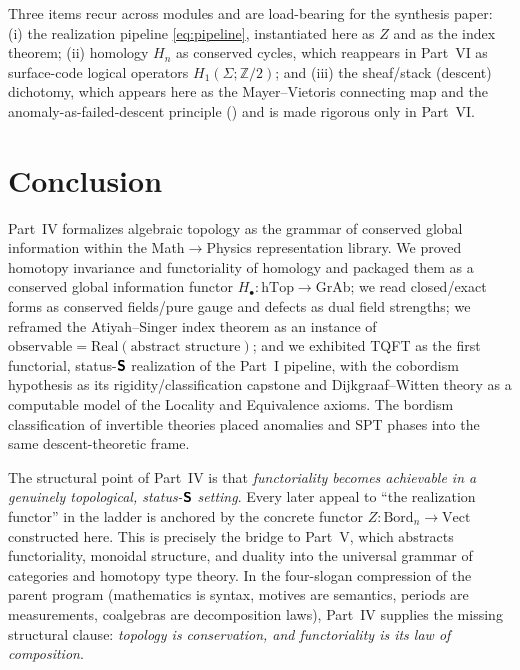 \documentclass[12pt]{article}
\theoremstyle{definition}
\theoremstyle{remark}
\newcommand{\Bord}{\mathrm{Bord}}
\newcommand{\Vect}{\mathrm{Vect}}
\newcommand{\hTop}{\mathrm{hTop}}
\newcommand{\GrAb}{\mathrm{GrAb}}
\newcommand{\Real}{\mathrm{Real}}
\newcommand{\Zm}{\mathbb{Z}}
\newcommand{\Sfont}{\textnormal{\sffamily\bfseries S}}
\begin{document}
Three items recur across modules and are load-bearing for the synthesis paper:
(i) the realization pipeline \eqref{eq:pipeline}, instantiated here as $Z$ and as
the index theorem; (ii) homology $H_n$ as conserved cycles, which reappears in
Part~VI as surface-code logical operators $H_1(\Sigma;\Zm/2)$; and (iii) the
sheaf/stack (descent) dichotomy, which appears here as the Mayer--Vietoris
connecting map and the anomaly-as-failed-descent principle ()
and is made rigorous only in Part~VI.

\section{Conclusion}
\label{sec:conclusion}

Part~IV formalizes algebraic topology as the grammar of conserved global
information within the Math$\to$Physics representation library. We proved homotopy
invariance and functoriality of homology and packaged them as a conserved global
information functor $H_\bullet\colon\hTop\to\GrAb$; we read closed/exact forms as
conserved fields/pure gauge and defects as dual field strengths; we reframed the
Atiyah--Singer index theorem as an instance of
$\text{observable}=\Real(\text{abstract structure})$; and we exhibited TQFT as the
first functorial, status-$\Sfont$ realization of the Part~I pipeline, with the
cobordism hypothesis as its rigidity/classification capstone and Dijkgraaf--Witten
theory as a computable model of the Locality and Equivalence axioms. The bordism
classification of invertible theories placed anomalies and SPT phases into the same
descent-theoretic frame.

The structural point of Part~IV is that \emph{functoriality becomes
achievable in a genuinely topological, status-$\Sfont$ setting}. Every later
appeal to ``the realization functor'' in the ladder is anchored by the concrete
functor $Z\colon\Bord_n\to\Vect$ constructed here. This is precisely the bridge to
Part~V, which abstracts functoriality, monoidal structure, and duality into the
universal grammar of categories and homotopy type theory. In the four-slogan
compression of the parent program (mathematics is syntax, motives are semantics,
periods are measurements, coalgebras are decomposition laws), Part~IV supplies the
missing structural clause: \emph{topology is conservation, and functoriality is its
law of composition}.

\end{document}
